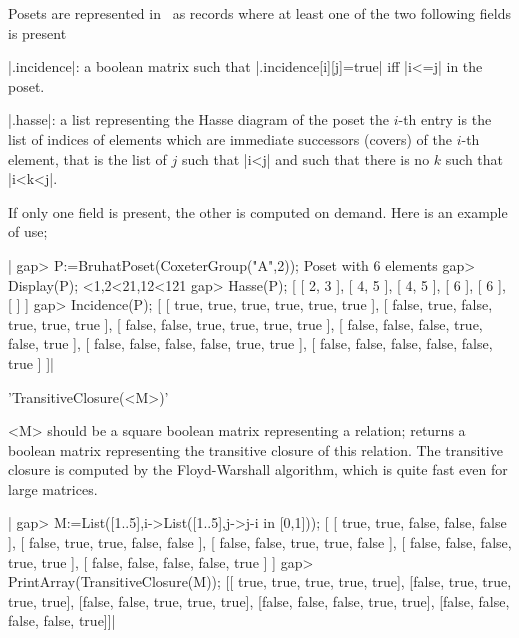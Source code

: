 

Posets are represented in \CHEVIE\ as records where at least one of the two
following fields is present\:

  |.incidence|:  a  boolean  matrix  such  that |.incidence[i][j]=true| iff
  |i<=j| in the poset.

  |.hasse|: a list representing the Hasse diagram of the poset\: the $i$-th
  entry  is the list of indices  of elements which are immediate successors
  (covers)  of the $i$-th element, that is  the list of $j$ such that |i<j|
  and such that there is no $k$ such that |i<k<j|.

If  only one field is present, the other  is computed on demand. Here is an
example of use;

|    gap> P:=BruhatPoset(CoxeterGroup("A",2));
    Poset with 6 elements
    gap> Display(P);
    <1,2<21,12<121
    gap> Hasse(P);
    [ [ 2, 3 ], [ 4, 5 ], [ 4, 5 ], [ 6 ], [ 6 ], [  ] ]
    gap> Incidence(P);
    [ [ true, true, true, true, true, true ],
      [ false, true, false, true, true, true ],
      [ false, false, true, true, true, true ],
      [ false, false, false, true, false, true ],
      [ false, false, false, false, true, true ],
      [ false, false, false, false, false, true ] ]|

%

'TransitiveClosure(<M>)'

<M>  should be a  square boolean matrix  representing a relation; returns a
boolean  matrix representing the  transitive closure of  this relation. The
transitive  closure is computed  by the Floyd-Warshall  algorithm, which is
quite fast even for large matrices.

|    gap> M:=List([1..5],i->List([1..5],j->j-i in [0,1]));
    [ [ true, true, false, false, false ],
      [ false, true, true, false, false ],
      [ false, false, true, true, false ],
      [ false, false, false, true, true ],
      [ false, false, false, false, true ] ]
    gap> PrintArray(TransitiveClosure(M));
    [[ true,  true,  true,  true, true],
     [false,  true,  true,  true, true],
     [false, false,  true,  true, true],
     [false, false, false,  true, true],
     [false, false, false, false, true]]|

